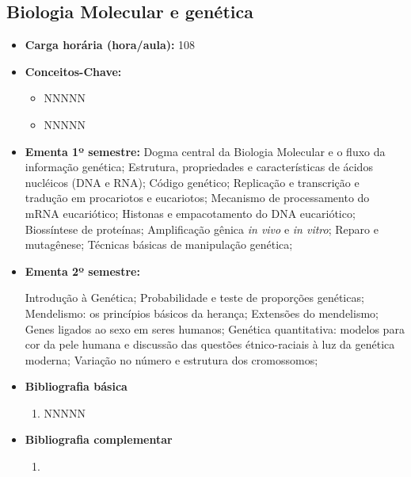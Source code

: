 \documentclass[11pt,fleqn]{book} %
\begin{document}
\subsection{Biologia Molecular e genética}\label{disc:biomol}
\begin{itemize}
	\item \textbf{Carga horária (hora/aula):} 108
	\item \textbf{Conceitos-Chave:}
	\begin{itemize}
		\item NNNNN
		\item NNNNN
	\end{itemize}
	\item \textbf{Ementa 1º semestre:}
	Dogma central da Biologia Molecular e o fluxo da informação genética;
	Estrutura, propriedades e características de ácidos nucléicos (DNA e RNA);
	Código genético; 
	Replicação e transcrição e tradução em procariotos e eucariotos;
	Mecanismo de processamento do mRNA eucariótico; 
	Histonas e empacotamento do DNA eucariótico; 
	Biossíntese de proteínas; 
	Amplificação gênica \textit{in vivo} e \textit{in vitro}; 
	Reparo e mutagênese;
	Técnicas básicas de manipulação genética;
	
	\item \textbf{Ementa 2º semestre:}	
	
	Introdução à Genética;
	Probabilidade e teste de proporções genéticas; 
	Mendelismo: os princípios básicos da herança; 
	Extensões do mendelismo; 
	Genes ligados ao sexo em seres humanos;
	Genética quantitativa: modelos para cor da pele humana e discussão das questões étnico-raciais à luz da genética moderna;
	Variação no número e estrutura dos cromossomos;
	
	\item \textbf{Bibliografia básica}
	\begin{enumerate}
		\item NNNNN
	\end{enumerate}
	\item \textbf{Bibliografia complementar}
	\begin{enumerate}
		\item 
	\end{enumerate}	
\end{itemize}

\newpage
\end{document}
